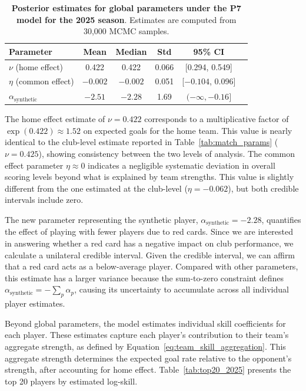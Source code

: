 \begin{table}[htbp]
    \centering
    \begin{tabular}{lccccc}
        \toprule
        Parameter & Mean & Median & Std & 95\% CI \\
        \midrule
        $\nu$ (home effect) & 0.422 & 0.422 & 0.066 & [0.294, 0.549] \\
        $\eta$ (common effect) & $-0.002$ & $-0.002$ & 0.051 & [$-0.104$, 0.096] \\
        $\alpha_{\text{synthetic}}$ & $-2.51$ & $-2.28$ & 1.69 & $(-\infty, -0.16]$ \\
        \bottomrule
    \end{tabular}
    \caption{
        \textbf{Posterior estimates for global parameters under the P7 model for the 2025 season}.
        Estimates are computed from 30,000 MCMC samples.
    }
    \label{tab:player_global_2025}
\end{table}

The home effect estimate of $\nu = 0.422$ corresponds to a multiplicative factor of $\exp(0.422) \approx 1.52$ on expected goals for the home team.
This value is nearly identical to the club-level estimate reported in Table~\ref{tab:match_params} ($\nu = 0.425$), showing consistency between the two levels of analysis.
The common effect parameter $\eta \approx 0$ indicates a negligible systematic deviation in overall scoring levels beyond what is explained by team strengths.
This value is slightly different from the one estimated at the club-level ($\eta = -0.062$), but both credible intervals include zero.

The new parameter representing the synthetic player, $\alpha_{\text{synthetic}} = -2.28$, quantifies the effect of playing with fewer players due to red cards.
Since we are interested in answering whether a red card has a negative impact on club performance, we calculate a unilateral credible interval.
Given the credible interval, we can affirm that a red card acts as a below-average player.
Compared with other parameters, this estimate has a larger variance because the sum-to-zero constraint defines $\alpha_{\text{synthetic}} = -\sum_{p} \alpha_p$, causing its uncertainty to accumulate across all individual player estimates.

Beyond global parameters, the model estimates individual skill coefficients for each player.
These estimates capture each player's contribution to their team's aggregate strength, as defined by Equation~\ref{eq:team_skill_aggregation}.
This aggregate strength determines the expected goal rate relative to the opponent's strength, after accounting for home effect.
Table~\ref{tab:top20_2025} presents the top 20 players by estimated log-skill.

